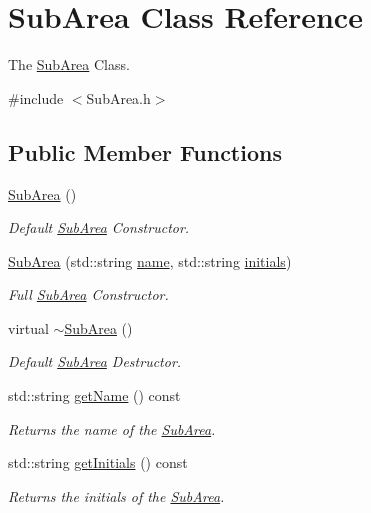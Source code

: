 \hypertarget{classSubArea}{}\section{Sub\+Area Class Reference}
\label{classSubArea}


The \mbox{\hyperlink{classSubArea}{Sub\+Area}} Class.  




{\ttfamily \#include $<$Sub\+Area.\+h$>$}

\subsection*{Public Member Functions}
\begin{DoxyCompactItemize}
\item 
\mbox{\hyperlink{classSubArea_a9649b113a07cc887aec5bdf83b75666c}{Sub\+Area}} ()
\begin{DoxyCompactList}\small\item\em Default \mbox{\hyperlink{classSubArea}{Sub\+Area}} Constructor. \end{DoxyCompactList}\item 
\mbox{\hyperlink{classSubArea_a27e357e4c5765eb3128fdde5cdf690e3}{Sub\+Area}} (std\+::string \mbox{\hyperlink{classSubArea_aa1b0997da15caea7144ae73963da9f82}{name}}, std\+::string \mbox{\hyperlink{classSubArea_a3e0a456f5ce325e2a778a17d1929b5d0}{initials}})
\begin{DoxyCompactList}\small\item\em Full \mbox{\hyperlink{classSubArea}{Sub\+Area}} Constructor. \end{DoxyCompactList}\item 
virtual \mbox{\hyperlink{classSubArea_a0423d8d6d9f297cc1ceff557279d9be8}{$\sim$\+Sub\+Area}} ()
\begin{DoxyCompactList}\small\item\em Default \mbox{\hyperlink{classSubArea}{Sub\+Area}} Destructor. \end{DoxyCompactList}\item 
std\+::string \mbox{\hyperlink{classSubArea_a8370d762b413cb20c233cf0ca56315da}{get\+Name}} () const
\begin{DoxyCompactList}\small\item\em Returns the name of the \mbox{\hyperlink{classSubArea}{Sub\+Area}}. \end{DoxyCompactList}\item 
std\+::string \mbox{\hyperlink{classSubArea_a0385787547e85f2481bc0031e6c98f10}{get\+Initials}} () const
\begin{DoxyCompactList}\small\item\em Returns the initials of the \mbox{\hyperlink{classSubArea}{Sub\+Area}}. \end{DoxyCompactList}\end{DoxyCompactItemize}
